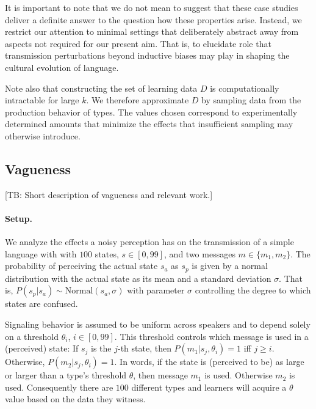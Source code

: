 \documentclass[10pt,a4paper]{article}
\newcommand{\tb}[1]{\textcolor[rgb]{.8,.33,.0}{[TB: #1]}}%
\begin{document}
It is important to note that we do not mean to suggest that these case studies deliver a definite answer to the question how these properties arise. Instead, we restrict our attention to minimal settings that deliberately abstract away from aspects not required for our present aim. That is, to elucidate role that transmission perturbations beyond inductive biases may play in shaping the cultural evolution of language.%

Note also that constructing the set of learning data $D$ is computationally intractable for large $k$. We therefore approximate $D$ by sampling data from the production behavior of types. The values chosen correspond to experimentally determined amounts that minimize the effects that insufficient sampling may otherwise introduce. 

\subsection{Vagueness}
\tb{Short description of vagueness and relevant work.}

\paragraph{Setup.} We analyze the effects a noisy perception has on the transmission of a simple language with with $100$ states, $s \in [0,99]$, and two messages $m \in \{m_1,m_2\}$. The probability of perceiving the actual state $s_a$ as $s_p$ is given by a normal distribution with the actual state as its mean and a standard deviation $\sigma$. That is, $P(s_p | s_a) \sim \text{Normal}(s_{a},\sigma)$ with parameter $\sigma$ controlling the degree to which states are confused. 

Signaling behavior is assumed to be uniform across speakers and to depend solely on a threshold $\theta_i$, $i \in [0,99]$. This threshold controls which message is used in a (perceived) state: If $s_j$ is the $j$-th state, then $P(m_1|s_j,\theta_i) = 1$ iff $j \geq i$. Otherwise, $P(m_2|s_j,\theta_i) = 1$. In words, if the state is (perceived to be) as large or larger than a type's threshold $\theta$, then message $m_1$ is used. Otherwise $m_2$ is used. Consequently there are $100$ different types and learners will acquire a $\theta$ value based on the data they witness.
\end{document}
